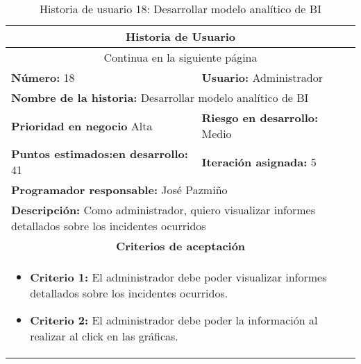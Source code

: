 

\begin{longtable}{|p{6.7cm}|p{6.7cm}|}
    \caption{Historia de usuario 18: Desarrollar modelo analítico de BI} \label{tab:historia-18}
    \\
    \hline
    \multicolumn{2}{|c|}{\textbf{Historia de Usuario}}                                                                                           \\
    \hline

    \endfirsthead

    \hline
    \endhead

    \hline
    \multicolumn{2}{|c|}{{Continua en la siguiente página}}                                                                                      \\
    \hline
    \endfoot

    \hline
    \endlastfoot

    \textbf{Número:} 18                                  & \textbf{Usuario:} Administrador                                                       \\
    \hline
    \multicolumn{2}{|l|}{\textbf{Nombre de la historia:} Desarrollar modelo analítico de BI}                                                     \\
    \hline
    \textbf{Prioridad en negocio}  Alta                  & \textbf{Riesgo en desarrollo:} Medio                                                  \\
    \hline
    \textbf{\textbf{Puntos estimados:}en desarrollo:} 41 & \textbf{Iteración asignada:} 5                                                        \\
    \hline
    \multicolumn{2}{|l|}{\textbf{Programador responsable:} José Pazmiño }                                                                        \\
    \hline
    \multicolumn{2}{|p{13.4cm}|}{\textbf{Descripción:} Como administrador, quiero visualizar informes detallados sobre los incidentes ocurridos} \\
    \hline
    \multicolumn{2}{|c|}{\textbf{Criterios de aceptación}}                                                                                       \\
    \hline
    \multicolumn{2}{|p{13.4cm}|}{
    \begin{itemize}[label={},leftmargin=*, nosep]
        \item \textbf{Criterio 1:} El administrador debe poder visualizar informes detallados sobre los incidentes ocurridos.
        \item  \textbf{Criterio 2:} El administrador debe poder la información al realizar al  click en las gráficas.
    \end{itemize}
    }
    \\
\end{longtable}